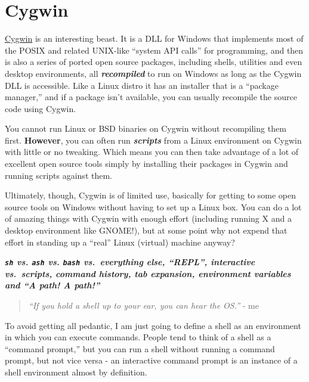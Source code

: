 \documentclass[10pt,]{book}
\numberwithin{figure}{chapter}
\DeclareRobustCommand{\drios}[1]{\index{OS and OS-Like Substances!#1}}
\begin{document}
\section{Cygwin}\label{cygwin}

\href{http://cygwin.com/}{Cygwin}\drios{Cygwin} is an interesting beast.
It is a DLL for Windows that implements most of the POSIX and related
UNIX-like ``system API calls'' for programming, and then is also a
series of ported open source packages, including shells, utilities and
even desktop environments, all \textbf{\emph{recompiled}} to run on
Windows as long as the Cygwin DLL is accessible. Like a Linux distro it
has an installer that is a ``package manager,'' and if a package isn't
available, you can usually recompile the source code using Cygwin.

You cannot run Linux or BSD binaries on Cygwin without recompiling them
first. \textbf{However}, you can often run \textbf{\emph{scripts}} from
a Linux environment on Cygwin with little or no tweaking. Which means
you can then take advantage of a lot of excellent open source tools
simply by installing their packages in Cygwin and running scripts
against them.

Ultimately, though, Cygwin is of limited use, basically for getting to
some open source tools on Windows without having to set up a Linux box.
You can do a lot of amazing things with Cygwin with enough effort
(including running X and a desktop environment like GNOME!), but at some
point why not expend that effort in standing up a ``real'' Linux
(virtual) machine anyway?


\textbf{\emph{\texttt{sh} vs. \texttt{ash} vs. \texttt{bash}
vs.~everything else, ``REPL'', interactive vs.~scripts, command history,
tab expansion, environment variables and ``A path! A path!''}}

\begin{quote}
\emph{``If you hold a shell up to your ear, you can hear the OS.''} - me
\end{quote}

To avoid getting all pedantic, I am just going to define a shell as an
environment in which you can execute commands. People tend to think of a
shell as a ``command prompt,'' but you can run a shell without running a
command prompt, but not vice versa - an interactive command prompt is an
instance of a shell environment almost by definition.
\end{document}
